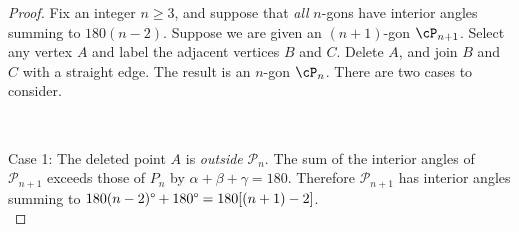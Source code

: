 \begin{proof}
Fix an integer $n\ge 3$, and suppose that \emph{all} $n$-gons have interior angles summing to $180(n-2)$\textdegree. Suppose we are given an $(n+1)$-gon $\cP_{n+1}$. Select any vertex $A$ and label the adjacent vertices $B$ and $C$. Delete $A$, and join $B$ and $C$ with a straight edge. The result is an $n$-gon $\cP_n$. There are two cases to consider.\addtocounter{footnote}{1}\footnotemark[\value{footnote}]\\[-5pt]

\noindent\begin{minipage}{0.64\textwidth}
Case 1: The deleted point $A$ is \emph{outside} $\mathcal{P}_n$. The sum of the interior angles of $\mathcal{P}_{n+1}$ exceeds those of $P_n$ by $\alpha+\beta+\gamma=180$\textdegree. Therefore $\mathcal{P}_{n+1}$ has interior angles summing to $180(n-2)\text{\textdegree}+180\text{\textdegree}=180[(n+1)-2]$\textdegree.\\[-5pt]


\end{minipage}
\end{proof}
